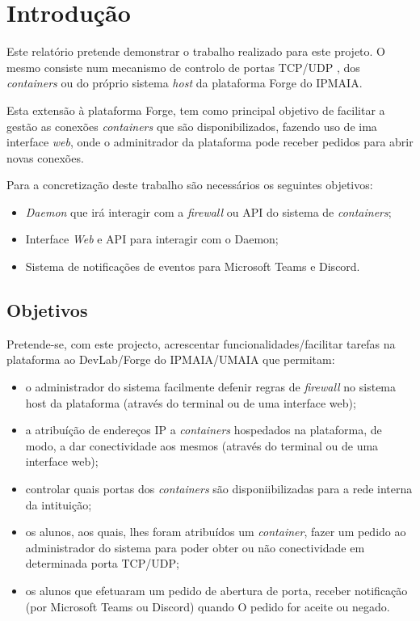 \chapter{Introdução}
\label{chap:introduction}

Este relatório pretende demonstrar o trabalho realizado para este projeto.
O mesmo consiste num mecanismo de controlo de portas TCP/UDP \cite{rfc9293},
\cite{rfc768} dos \textit{containers} ou do próprio sistema \textit{host}
da plataforma Forge do IPMAIA.

Esta extensão à plataforma Forge, tem 
como principal objetivo de facilitar a gestão as conexões \textit{containers} 
que são disponibilizados, fazendo uso de ima interface \textit{web}, onde o adminitrador da 
plataforma pode receber pedidos para abrir novas conexões. 

Para a concretização deste trabalho são necessários os seguintes objetivos:\\

\begin{itemize}
\item \textit{Daemon} que irá interagir com a \textit{firewall} ou API do sistema de \textit{containers};
\item Interface \textit{Web} e API para interagir com o Daemon;
\item Sistema de notificações de eventos para Microsoft Teams e Discord.
\end{itemize}


\section{Objetivos}
\label{sec:object}

Pretende-se, com este projecto, acrescentar funcionalidades/facilitar tarefas na plataforma ao
DevLab/Forge do IPMAIA/UMAIA que permitam:

\begin{itemize}
\item o administrador do sistema facilmente defenir regras de \textit{firewall} no sistema host da plataforma (através do terminal ou de uma interface web);
\item a atribuíção de endereços IP a \textit{containers} hospedados na plataforma, de modo,
a dar conectividade aos mesmos (através do terminal ou de uma interface web);
\item controlar quais portas dos \textit{containers} são disponiibilizadas para a rede interna da intituição;
\item os alunos, aos quais, lhes foram atribuídos um \textit{container}, fazer um pedido ao administrador do sistema para poder
obter ou não conectividade em determinada porta TCP/UDP;
\item os alunos que efetuaram um pedido de abertura de porta, receber notificação (por Microsoft Teams ou Discord) quando O
pedido for aceite ou negado.

\end{itemize}

